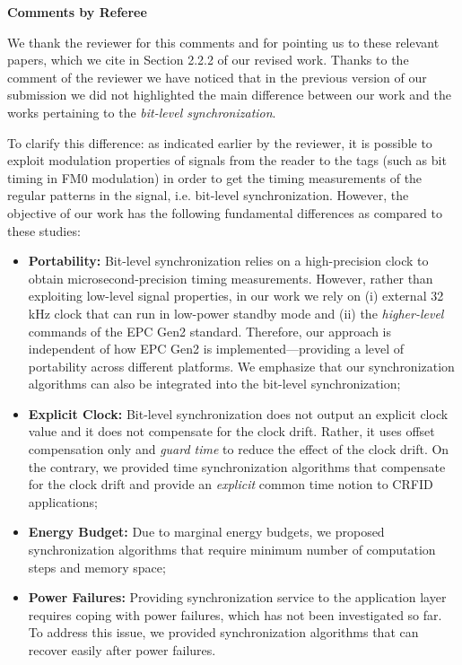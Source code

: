 \documentclass[10pt]{article}
\newcommand{\response}[1]{{\color{blue} #1}}
\newcounter{refereeCounter}
\newenvironment{responses}{%
\refstepcounter{refereeCounter}%
\textbf{\large Comments by Referee \therefereeCounter}
\begin{enumerate}%
\renewcommand{\labelenumi}{\textbf{[R\therefereeCounter :\,\arabic{enumi}]}} %
}{\end{enumerate}}
\begin{document}
\begin{responses}
\response{We thank the reviewer for this comments and for pointing us to these relevant papers, which we cite in Section 2.2.2 of our revised work. Thanks to the comment of the reviewer we have noticed that in the previous version of our submission we did not highlighted the main difference between our work and the works pertaining to the \emph{bit-level synchronization}.

To clarify this difference: as indicated earlier by the reviewer, it is possible to exploit modulation properties of signals from the reader to the tags (such as bit timing in FM0 modulation) in order to get the timing measurements of the regular patterns in the signal, i.e. bit-level synchronization. However, the objective of our work has the following fundamental differences as compared to these studies:

\begin{itemize}
	\item \textbf{Portability:} Bit-level synchronization relies on a high-precision clock to obtain microsecond-precision timing measurements. However, rather than exploiting low-level signal properties, in our work we rely on (i) external 32\,kHz clock that can run in low-power standby mode and (ii) the \emph{higher-level} commands of the EPC Gen2 standard. Therefore, our approach is independent of how EPC Gen2 is implemented---providing a level of portability across different platforms. We emphasize that our synchronization algorithms can also be integrated into the bit-level synchronization;
	
	\item \textbf{Explicit Clock:} Bit-level synchronization does not output an explicit clock value and it does not compensate for the clock drift. Rather, it uses offset compensation only and \emph{guard time} to reduce the effect of the clock drift. On the contrary, we provided time synchronization algorithms that compensate for the clock drift and provide an \emph{explicit} common time notion to CRFID applications;
	
	\item \textbf{Energy Budget:} Due to marginal energy budgets, we proposed synchronization algorithms that require minimum number of computation steps and memory space;
	
	\item \textbf{Power Failures:} Providing synchronization service to the application layer requires coping with power failures, which has not been investigated so far. To address this issue, we provided synchronization algorithms that can recover easily after power failures.
\end{itemize}

}
\end{responses}
\end{document}

